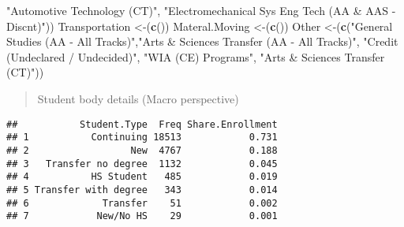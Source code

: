 \documentclass[]{article}
\newenvironment{Shaded}{\begin{snugshade}}{\end{snugshade}}
\newcommand{\KeywordTok}[1]{\textcolor[rgb]{0.13,0.29,0.53}{\textbf{#1}}}
\newcommand{\DataTypeTok}[1]{\textcolor[rgb]{0.13,0.29,0.53}{#1}}
\newcommand{\DecValTok}[1]{\textcolor[rgb]{0.00,0.00,0.81}{#1}}
\newcommand{\StringTok}[1]{\textcolor[rgb]{0.31,0.60,0.02}{#1}}
\newcommand{\OperatorTok}[1]{\textcolor[rgb]{0.81,0.36,0.00}{\textbf{#1}}}
\newcommand{\NormalTok}[1]{#1}
\begin{document}
\begin{Shaded}
\begin{Highlighting}[]
                                      \StringTok{"Automotive Technology (CT)"}\NormalTok{, }
                                      \StringTok{"Electromechanical Sys Eng Tech (AA & AAS - Discnt)"}\NormalTok{))}
\NormalTok{Transportation  <-(}\KeywordTok{c}\NormalTok{())}
\NormalTok{Materal.Moving  <-(}\KeywordTok{c}\NormalTok{())}
\NormalTok{Other <-(}\KeywordTok{c}\NormalTok{(}\StringTok{"General Studies (AA - All Tracks)"}\NormalTok{,}\StringTok{"Arts & Sciences Transfer (AA - All Tracks)"}\NormalTok{,}
           \StringTok{"Credit (Undeclared / Undecided)"}\NormalTok{, }\StringTok{"WIA (CE) Programs"}\NormalTok{, }\StringTok{"Arts & Sciences Transfer (CT)"}\NormalTok{))}
\end{Highlighting}
\end{Shaded}

\begin{quote}
Student body details (Macro perspective)
\end{quote}

\begin{Shaded}
\end{Shaded}

\begin{verbatim}
##           Student.Type  Freq Share.Enrollment
## 1           Continuing 18513            0.731
## 2                  New  4767            0.188
## 3   Transfer no degree  1132            0.045
## 4           HS Student   485            0.019
## 5 Transfer with degree   343            0.014
## 6             Transfer    51            0.002
## 7            New/No HS    29            0.001
\end{verbatim}
\end{document}
